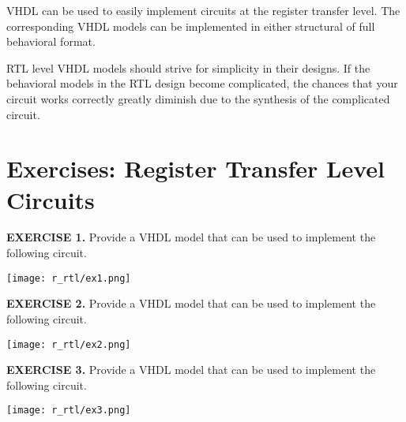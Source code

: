 \begin{my_list}
\item VHDL can be used to easily implement circuits at the register transfer level. The corresponding VHDL models can be implemented in either structural of full behavioral format.

\item RTL level VHDL models should strive for simplicity in their designs. If the behavioral models in the RTL design become complicated, the chances that your circuit works correctly greatly diminish due to the synthesis of the complicated circuit.
\end{my_list}

\section{Exercises: Register Transfer Level Circuits}

\vspace{20pt}
\noindent
\begin{minipage}[t]{0.5\textwidth}
\textbf{EXERCISE 1.}
Provide a VHDL model that can be used to implement the following circuit.
\end{minipage}
\begin{minipage}[t]{0.47\textwidth}
\vspace{0pt}\raggedright
\centering
\texttt{[image: r\_rtl/ex1.png]}
\end{minipage}

\vspace{20pt}
\noindent
\begin{minipage}[t]{0.5\textwidth}
\textbf{EXERCISE 2.}
Provide a VHDL model that can be used to implement the following circuit.
\end{minipage}
\begin{minipage}[t]{0.47\textwidth}
\vspace{0pt}\raggedright
\centering
\texttt{[image: r\_rtl/ex2.png]}
\end{minipage}

\vspace{20pt}
\noindent
\begin{minipage}[t]{0.5\textwidth}
\textbf{EXERCISE 3.}
Provide a VHDL model that can be used to implement the following circuit.
\end{minipage}
\begin{minipage}[t]{0.47\textwidth}
\vspace{0pt}\raggedright
\centering
\texttt{[image: r\_rtl/ex3.png]}
\end{minipage}


